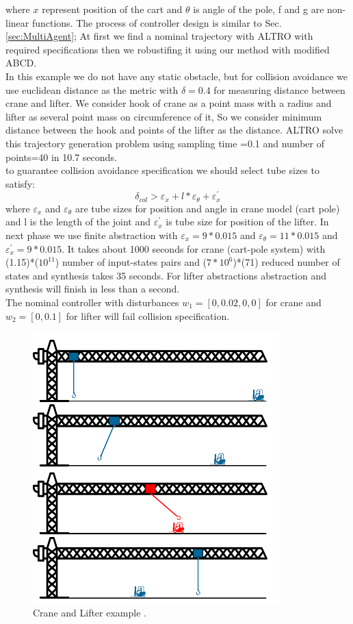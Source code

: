 where $x$ represent position of the cart  and $\theta$ is angle of the pole, f and g are non-linear functions. The process of controller design is similar to Sec. \ref{sec:MultiAgent}; At first we find a nominal trajectory with ALTRO with required specifications then we robustifing it using our method with modified ABCD.\\
In this example we do not have any static obstacle, but for collision avoidance we use euclidean distance as the metric with $\delta=0.4$ for measuring distance between crane and lifter. We consider hook of crane as a point mass with a radius and lifter as several point mass on circumference of it, So we consider minimum distance between the hook and points of the lifter as the distance. ALTRO solve this trajectory generation problem using sampling time =0.1 and number of points=40 in 10.7 seconds.\\
to guarantee collision avoidance specification we should select tube sizes to satisfy:
\[ \delta_{col}> \varepsilon_x + l*\varepsilon_\theta + \varepsilon^\prime_x\]
where $\varepsilon_x$ and $\varepsilon_\theta$ are tube sizes for position and angle in crane model (cart pole) and l is the length of the joint and $\varepsilon^\prime_x$ is tube size for position of the lifter.
In next phase we use finite abstraction with $\varepsilon_x=9*0.015$ and $\varepsilon_\theta=11*0.015$ and $\varepsilon^\prime_x=9*0.015$. It takes about 1000 seconds for crane (cart-pole system) with (1.15)*($10^{11}$) number of input-states pairs and ($7*10^6$)*(71) reduced number of states and synthesis takes 35 seconds. For lifter abstractions abstraction and synthesis will finish in less than a second.\\
The nominal controller with disturbances $w_1=[0,0.02,0,0]$ for crane and $w_2=[0,0.1]$ for lifter will fail collision specification.


\begin{figure}[t]\label{fig:cr_and_lft}
	\centering
	\includegraphics[width=0.85\textwidth]{figures/crane_and_lifter.png}
	\caption{Crane and Lifter example .}
\end{figure}

